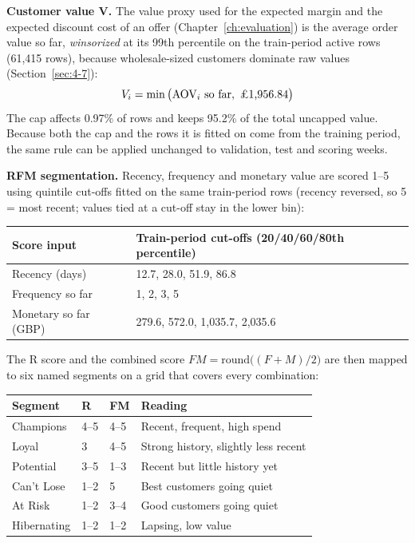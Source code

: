 \textbf{Customer value V.} The value proxy used for the expected margin and the expected discount cost of an offer (Chapter~\ref{ch:evaluation}) is the average order value so far, \emph{winsorized} at its 99th percentile on the train-period active rows (61,415 rows), because wholesale-sized customers dominate raw values (Section~\ref{sec:4-7}):
\begin{equation*}
    V_i = \min\big(\text{AOV}_i \text{ so far},\ \text{\pounds1,956.84}\big)
\end{equation*}
The cap affects 0.97\% of rows and keeps 95.2\% of the total uncapped value. Because both the cap and the rows it is fitted on come from the training period, the same rule can be applied unchanged to validation, test and scoring weeks.

\textbf{RFM segmentation.} Recency, frequency and monetary value are scored 1--5 using quintile cut-offs fitted on the same train-period rows (recency reversed, so 5 = most recent; values tied at a cut-off stay in the lower bin):

\begin{center}
\begin{tabular}{@{}p{3.6cm}p{8cm}@{}}
    \toprule
    Score input & Train-period cut-offs (20/40/60/80th percentile) \\
    \midrule
    Recency (days) & 12.7, 28.0, 51.9, 86.8 \\
    Frequency so far & 1, 2, 3, 5 \\
    Monetary so far (GBP) & 279.6, 572.0, 1,035.7, 2,035.6 \\
    \bottomrule
\end{tabular}
\end{center}

The R score and the combined score $FM = \text{round}\big((F + M)/2\big)$ are then mapped to six named segments on a grid that covers every combination:

\begin{center}
\begin{tabular}{@{}p{2.6cm}p{1.6cm}p{1.6cm}p{7.2cm}@{}}
    \toprule
    Segment & R & FM & Reading \\
    \midrule
    Champions & 4--5 & 4--5 & Recent, frequent, high spend \\
    Loyal & 3 & 4--5 & Strong history, slightly less recent \\
    Potential & 3--5 & 1--3 & Recent but little history yet \\
    Can't Lose & 1--2 & 5 & Best customers going quiet \\
    At Risk & 1--2 & 3--4 & Good customers going quiet \\
    Hibernating & 1--2 & 1--2 & Lapsing, low value \\
    \bottomrule
\end{tabular}
\end{center}

